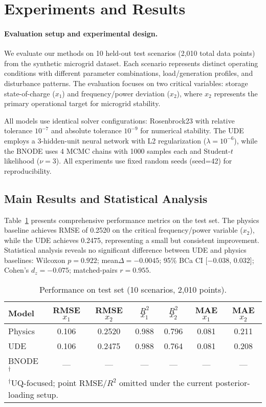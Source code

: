 \section{Experiments and Results}

\paragraph{Evaluation setup and experimental design.} We evaluate our methods on 10 held-out test scenarios (2,010 total data points) from the synthetic microgrid dataset. Each scenario represents distinct operating conditions with different parameter combinations, load/generation profiles, and disturbance patterns. The evaluation focuses on two critical variables: storage state-of-charge ($x_1$) and frequency/power deviation ($x_2$), where $x_2$ represents the primary operational target for microgrid stability.

All models use identical solver configurations: Rosenbrock23 with relative tolerance $10^{-7}$ and absolute tolerance $10^{-9}$ for numerical stability. The UDE employs a 3-hidden-unit neural network with L2 regularization ($\lambda = 10^{-6}$), while the BNODE uses 4 MCMC chains with 1000 samples each and Student-$t$ likelihood ($\nu = 3$). All experiments use fixed random seeds (seed=42) for reproducibility. %

\subsection{Main Results and Statistical Analysis}

Table~\ref{tab:performance} presents comprehensive performance metrics on the test set. The physics baseline achieves RMSE of 0.2520 on the critical frequency/power variable ($x_2$), while the UDE achieves 0.2475, representing a small but consistent improvement. Statistical analysis reveals no significant difference between UDE and physics baselines: Wilcoxon $p = 0.922$; mean$\Delta = -0.0045$; 95\% BCa CI [$-0.038$, $0.032$]; Cohen's $d_z = -0.075$; matched-pairs $r = 0.955$. %

\begin{table}[H]
\centering
\caption{Performance on test set (10 scenarios, 2,010 points).}
\label{tab:performance}
\small
\begin{tabular}{@{}lcccccc@{}}
\toprule
Model & RMSE $x_1$ & RMSE $x_2$ & $R^2$ $x_1$ & $R^2$ $x_2$ & MAE $x_1$ & MAE $x_2$ \\
\midrule
Physics & 0.106 & 0.2520 & 0.988 & 0.796 & 0.081 & 0.211 \\
UDE & 0.106 & 0.2475 & 0.988 & 0.764 & 0.081 & 0.208 \\
BNODE$^\dagger$ & --- & --- & --- & --- & --- & --- \\
\bottomrule
\multicolumn{7}{l}{\footnotesize $^\dagger$UQ-focused; point RMSE/$R^2$ omitted under the current posterior-loading setup.}
\end{tabular}
\end{table}

